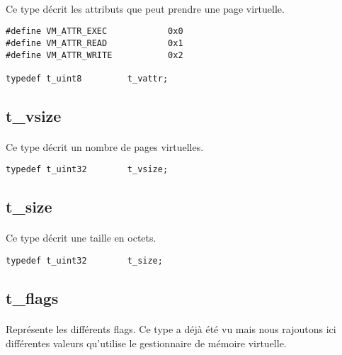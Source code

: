 \documentclass[10pt,a4wide]{article}
\begin{document}
\paragraph{}

Ce type d\'ecrit les attributs que peut prendre une page virtuelle.

\begin{verbatim}
#define VM_ATTR_EXEC            0x0
#define VM_ATTR_READ            0x1
#define VM_ATTR_WRITE           0x2

typedef t_uint8         t_vattr;
\end{verbatim}

\subsection{t\_vsize}

\paragraph{}

Ce type d\'ecrit un nombre de pages virtuelles.

\begin{verbatim}
typedef t_uint32        t_vsize;
\end{verbatim}

\subsection{t\_size}

\paragraph{}

Ce type d\'ecrit une taille en octets.

\begin{verbatim}
typedef t_uint32        t_size;
\end{verbatim}

\subsection{t\_flags}

\paragraph{}

Repr\'esente les diff\'erents flags. Ce type a d\'ej\`a \'et\'e vu mais nous
rajoutons ici diff\'erentes valeurs qu'utilise le gestionnaire de m\'emoire
virtuelle.
\end{document}
